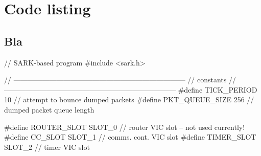\documentclass[a4paper, 11pt]{article}
\begin{document}
\chapter{Code listing}
\section{Bla}
\begin{pyglist}
// SARK-based program
#include <sark.h>

// ------------------------------------------------------------------------
// constants
// ------------------------------------------------------------------------
#define TICK_PERIOD        10      // attempt to bounce dumped packets
#define PKT_QUEUE_SIZE     256     // dumped packet queue length

#define ROUTER_SLOT        SLOT_0  // router VIC slot -- not used currently!
#define CC_SLOT            SLOT_1  // comms. cont. VIC slot
#define TIMER_SLOT         SLOT_2  // timer VIC slot
\end{pyglist}
\end{document}
